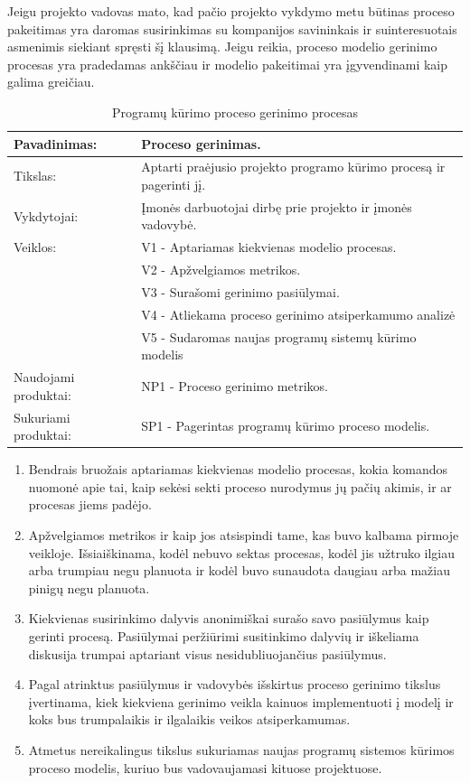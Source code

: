 \documentclass{VUMIFPSkursinis}
\begin{document}
				Jeigu projekto vadovas mato, kad pačio projekto vykdymo metu būtinas proceso pakeitimas yra daromas susirinkimas su kompanijos savininkais ir suinteresuotais asmenimis siekiant spręsti šį klausimą. 
				Jeigu reikia, proceso modelio gerinimo procesas yra pradedamas ankščiau ir modelio pakeitimai yra įgyvendinami kaip galima greičiau.
	\begin{center}
		\begin{table}[ht]
			\caption{Programų kūrimo proceso gerinimo procesas}
			\begin{tabular}{ | l | l | }
				\hline
				Pavadinimas:		& Proceso gerinimas.						\\ \hline
				Tikslas:		& Aptarti praėjusio projekto programo kūrimo procesą ir pagerinti jį.			\\ \hline
				Vykdytojai:		& Įmonės darbuotojai dirbę prie projekto ir įmonės vadovybė.					\\ \hline
				Veiklos:		& V1 - Aptariamas kiekvienas modelio procesas. 				\\
							& V2 - Apžvelgiamos metrikos.	\\
							& V3 - Surašomi gerinimo pasiūlymai.				\\ 
							& V4 - Atliekama proceso gerinimo atsiperkamumo analizė \\ 
							& V5 - Sudaromas naujas programų sistemų kūrimo modelis \\ \hline
				Naudojami produktai:	& NP1 - Proceso gerinimo metrikos. 				\\ \hline
				Sukuriami produktai:	& SP1 - Pagerintas programų kūrimo proceso modelis.		\\ \hline
			\end{tabular}
		\end{table}
	\end{center}

	\begin{enumerate}
		\item{Bendrais bruožais aptariamas kiekvienas modelio procesas, kokia komandos nuomonė apie tai, kaip sekėsi sekti proceso nurodymus jų pačių akimis, ir ar procesas jiems padėjo.}
		\item{Apžvelgiamos metrikos ir kaip jos atsispindi tame, kas buvo kalbama pirmoje veikloje. 
			Išsiaiškinama, kodėl nebuvo sektas procesas, kodėl jis užtruko ilgiau arba trumpiau negu planuota ir kodėl buvo sunaudota daugiau arba mažiau pinigų negu planuota.}
		\item{Kiekvienas susirinkimo dalyvis anonimiškai surašo savo pasiūlymus kaip gerinti procesą.
			Pasiūlymai peržiūrimi susitinkimo dalyvių ir iškeliama diskusija trumpai aptariant visus nesidubliuojančius pasiūlymus.}
		\item{Pagal atrinktus pasiūlymus ir vadovybės išskirtus proceso gerinimo tikslus įvertinama, kiek kiekviena gerinimo veikla kainuos implementuoti į modelį ir koks bus trumpalaikis ir ilgalaikis veikos atsiperkamumas.}
		\item{Atmetus nereikalingus tikslus sukuriamas naujas programų sistemos kūrimos proceso modelis, kuriuo bus vadovaujamasi kituose projektuose.}
	\end{enumerate}
\end{document}
